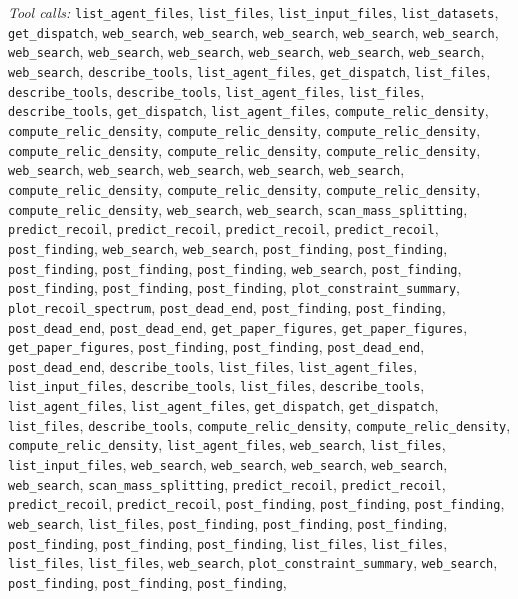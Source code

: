 \documentclass[11pt,a4paper]{article}
\begin{document}
\textit{Tool calls:} \texttt{list\_agent\_files}, \texttt{list\_files}, \texttt{list\_input\_files}, \texttt{list\_datasets}, \texttt{get\_dispatch}, \texttt{web\_search}, \texttt{web\_search}, \texttt{web\_search}, \texttt{web\_search}, \texttt{web\_search}, \texttt{web\_search}, \texttt{web\_search}, \texttt{web\_search}, \texttt{web\_search}, \texttt{web\_search}, \texttt{web\_search}, \texttt{web\_search}, \texttt{describe\_tools}, \texttt{list\_agent\_files}, \texttt{get\_dispatch}, \texttt{list\_files}, \texttt{describe\_tools}, \texttt{describe\_tools}, \texttt{list\_agent\_files}, \texttt{list\_files}, \texttt{describe\_tools}, \texttt{get\_dispatch}, \texttt{list\_agent\_files}, \texttt{compute\_relic\_density}, \texttt{compute\_relic\_density}, \texttt{compute\_relic\_density}, \texttt{compute\_relic\_density}, \texttt{compute\_relic\_density}, \texttt{compute\_relic\_density}, \texttt{compute\_relic\_density}, \texttt{web\_search}, \texttt{web\_search}, \texttt{web\_search}, \texttt{web\_search}, \texttt{web\_search}, \texttt{compute\_relic\_density}, \texttt{compute\_relic\_density}, \texttt{compute\_relic\_density}, \texttt{compute\_relic\_density}, \texttt{web\_search}, \texttt{web\_search}, \texttt{scan\_mass\_splitting}, \texttt{predict\_recoil}, \texttt{predict\_recoil}, \texttt{predict\_recoil}, \texttt{predict\_recoil}, \texttt{post\_finding}, \texttt{web\_search}, \texttt{web\_search}, \texttt{post\_finding}, \texttt{post\_finding}, \texttt{post\_finding}, \texttt{post\_finding}, \texttt{post\_finding}, \texttt{web\_search}, \texttt{post\_finding}, \texttt{post\_finding}, \texttt{post\_finding}, \texttt{post\_finding}, \texttt{plot\_constraint\_summary}, \texttt{plot\_recoil\_spectrum}, \texttt{post\_dead\_end}, \texttt{post\_finding}, \texttt{post\_finding}, \texttt{post\_dead\_end}, \texttt{post\_dead\_end}, \texttt{get\_paper\_figures}, \texttt{get\_paper\_figures}, \texttt{get\_paper\_figures}, \texttt{post\_finding}, \texttt{post\_finding}, \texttt{post\_dead\_end}, \texttt{post\_dead\_end}, \texttt{describe\_tools}, \texttt{list\_files}, \texttt{list\_agent\_files}, \texttt{list\_input\_files}, \texttt{describe\_tools}, \texttt{list\_files}, \texttt{describe\_tools}, \texttt{list\_agent\_files}, \texttt{list\_agent\_files}, \texttt{get\_dispatch}, \texttt{get\_dispatch}, \texttt{list\_files}, \texttt{describe\_tools}, \texttt{compute\_relic\_density}, \texttt{compute\_relic\_density}, \texttt{compute\_relic\_density}, \texttt{list\_agent\_files}, \texttt{web\_search}, \texttt{list\_files}, \texttt{list\_input\_files}, \texttt{web\_search}, \texttt{web\_search}, \texttt{web\_search}, \texttt{web\_search}, \texttt{web\_search}, \texttt{scan\_mass\_splitting}, \texttt{predict\_recoil}, \texttt{predict\_recoil}, \texttt{predict\_recoil}, \texttt{predict\_recoil}, \texttt{post\_finding}, \texttt{post\_finding}, \texttt{post\_finding}, \texttt{web\_search}, \texttt{list\_files}, \texttt{post\_finding}, \texttt{post\_finding}, \texttt{post\_finding}, \texttt{post\_finding}, \texttt{post\_finding}, \texttt{post\_finding}, \texttt{list\_files}, \texttt{list\_files}, \texttt{list\_files}, \texttt{list\_files}, \texttt{web\_search}, \texttt{plot\_constraint\_summary}, \texttt{web\_search}, \texttt{post\_finding}, \texttt{post\_finding}, \texttt{post\_finding}, 
\end{document}
